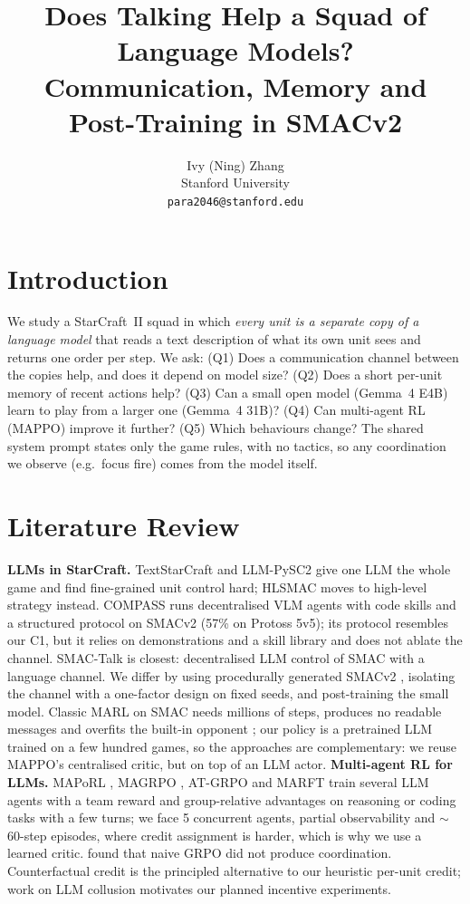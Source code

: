 \documentclass{article} %
\title{Does Talking Help a Squad of Language Models? \\ Communication, Memory and Post-Training in SMACv2}
\author{Ivy (Ning) Zhang \\
Stanford University \\
\texttt{para2046@stanford.edu}}
\begin{document}
\maketitle

\section{Introduction}
We study a StarCraft~II squad in which \emph{every unit is a separate copy of a language model} that reads
a text description of what its own unit sees and returns one order per step. We ask: (Q1) Does a
communication channel between the copies help, and does it depend on model size? (Q2) Does a short
per-unit memory of recent actions help? (Q3) Can a small open model (Gemma~4 E4B) learn to play from a
larger one (Gemma~4 31B)? (Q4) Can multi-agent RL (MAPPO) improve it further? (Q5) Which behaviours
change? The shared system prompt states only the game rules, with no tactics, so any coordination we
observe (e.g.\ focus fire) comes from the model itself.

\section{Literature Review}
\textbf{LLMs in StarCraft.} TextStarCraft \citep{ma2023textsc2} and LLM-PySC2 \citep{llmpysc2} give one
LLM the whole game and find fine-grained unit control hard; HLSMAC \citep{hlsmac2025} moves to
high-level strategy instead. COMPASS \citep{li2025compass} runs decentralised VLM agents with code
skills and a structured protocol on SMACv2 (57\% on Protoss 5v5); its protocol resembles our C1, but it
relies on demonstrations and a skill library and does not ablate the channel. SMAC-Talk
\citep{smactalk2026} is closest: decentralised LLM control of SMAC with a language channel. We differ by
using procedurally generated SMACv2 \citep{ellis2023smacv2}, isolating the channel with a one-factor
design on fixed seeds, and post-training the small model. Classic MARL on SMAC
\citep{samvelyan2019smac,rashid2018qmix,yu2022mappo} needs millions of steps, produces no readable
messages and overfits the built-in opponent \citep{deng2024smachard}; our policy is a pretrained LLM
trained on a few hundred games, so the approaches are complementary: we reuse MAPPO's centralised
critic, but on top of an LLM actor.
\textbf{Multi-agent RL for LLMs.} MAPoRL \citep{park2025maporl}, MAGRPO \citep{magrpo2025}, AT-GRPO
\citep{strongermas2025} and MARFT \citep{liao2025marft} train several LLM agents with a team reward and
group-relative advantages \citep{shao2024grpo} on reasoning or coding tasks with a few turns; we face
5 concurrent agents, partial observability and $\sim$60-step episodes, where credit assignment is
harder, which is why we use a learned critic. \citet{hasan2026grpo} found that naive GRPO did not
produce coordination. Counterfactual credit \citep{foerster2018coma,li2026ccpo} is the principled
alternative to our heuristic per-unit credit; work on LLM collusion
\citep{motwani2024secret,nakamura2026colosseum} motivates our planned incentive experiments.
\end{document}

